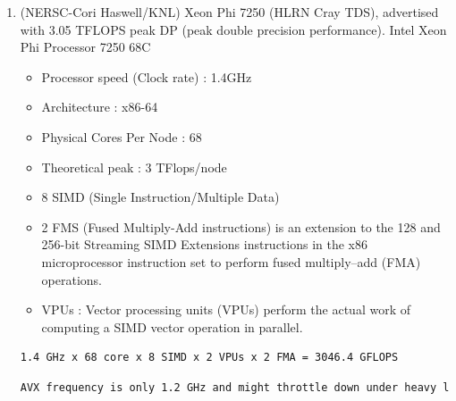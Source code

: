 \documentclass{article}
\begin{document}
\begin{enumerate}
\item (NERSC-Cori Haswell/KNL) Xeon Phi 7250 (HLRN Cray TDS), advertised with 3.05 TFLOPS peak DP (peak double precision performance).%
Intel Xeon Phi Processor 7250 68C 
\begin{itemize}
 \item Processor speed (Clock rate) : 1.4GHz
 \item Architecture    : x86-64
 \item Physical Cores Per Node :  68
 \item Theoretical peak : 3 TFlops/node
 \item 8 SIMD (Single Instruction/Multiple Data)
 \item 2 FMS (Fused Multiply-Add instructions) is an extension to the 128 and 256-bit Streaming SIMD Extensions instructions in the x86 microprocessor instruction set to perform fused multiply–add (FMA) operations.
 \item VPUs : Vector processing units (VPUs) perform the actual work of computing a SIMD vector operation in parallel. 
\end{itemize}



\begin{lstlisting}[language=bash,numbers=none,basicstyle=\tiny]
1.4 GHz x 68 core x 8 SIMD x 2 VPUs x 2 FMA = 3046.4 GFLOPS
\end{lstlisting}

\begin{lstlisting}[language=bash,numbers=none,basicstyle=\tiny]
AVX frequency is only 1.2 GHz and might throttle down under heavy load => actual peak: 2611.2 GFLOPS
\end{lstlisting}
\end{enumerate}
\end{document}
